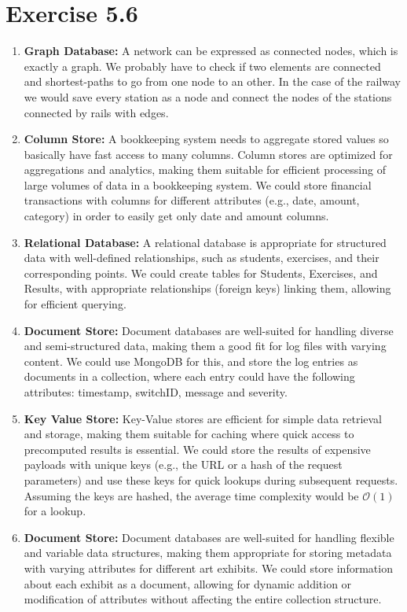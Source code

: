 \documentclass{article} %
\newcommand{\homeworkNumber}{5}
\begin{document}
\section*{Exercise \homeworkNumber.6}

\begin{enumerate}[(1)]
\item \textbf{Graph Database:} A network can be expressed as connected nodes, which is exactly a graph. We probably have to check if two elements are connected and shortest-paths to go from one node to an other. In the case of the railway we would save every station as a node and connect the nodes of the stations connected by rails with edges.

\item \textbf{Column Store:} A bookkeeping system needs to aggregate stored values so basically have fast access to many columns. Column stores are optimized for aggregations and analytics, making them suitable for efficient processing of large volumes of data in a bookkeeping system. We could store financial transactions with columns for different attributes (e.g., date, amount, category) in order to easily get only date and amount columns.

\item \textbf{Relational Database:} A relational database is appropriate for structured data with well-defined relationships, such as students, exercises, and their corresponding points. We could create tables for Students, Exercises, and Results, with appropriate relationships (foreign keys) linking them, allowing for efficient querying.

\item \textbf{Document Store:} Document databases are well-suited for handling diverse and semi-structured data, making them a good fit for log files with varying content. We could use MongoDB for this, and store the log entries as documents in a collection, where each entry could have the following attributes: timestamp, switchID, message and severity.

\item \textbf{Key Value Store:} Key-Value stores are efficient for simple data retrieval and storage, making them suitable for caching where quick access to precomputed results is essential. We could store the results of expensive payloads with unique keys (e.g., the URL or a hash of the request parameters) and use these keys for quick lookups during subsequent requests. Assuming the keys are hashed, the average time complexity would be $\mathcal{O}(1)$ for a lookup.

\item \textbf{Document Store:}  Document databases are well-suited for handling flexible and variable data structures, making them appropriate for storing metadata with varying attributes for different art exhibits. We could store information about each exhibit as a document, allowing for dynamic addition or modification of attributes without affecting the entire collection structure.
\end{enumerate}
\end{document}
